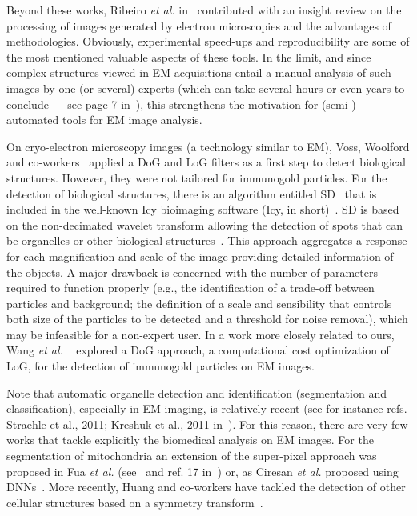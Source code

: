 \documentclass[a4paper,11pt]{article}
\newcommand{\1}{\mathbbm{1}}
\newcommand{\etal}{\emph{et al.} }
\theoremstyle{plain}
\begin{document}
Beyond these works, Ribeiro \etal in~\cite{ribeiro2006computer} contributed with an insight review on the processing of images generated by electron microscopies and the advantages of methodologies. Obviously, experimental speed-ups and reproducibility are some of the most mentioned valuable aspects of these tools. In the limit, and since complex structures viewed in \ac{EM} acquisitions entail a manual analysis of such images by one (or several) experts (which  can take several hours or even years to conclude --- see page 7 in~\cite{knott2013}), this strengthens the motivation for (semi-) automated tools for \ac{EM} image analysis.


On cryo-electron microscopy images (a technology similar to \ac{EM}), Voss, Woolford and co-workers~\cite{voss2009dog,woolford2007laplacian} applied a \ac{DoG} and \ac{LoG} filters as a first step to detect biological structures. However, they were not tailored for immunogold particles. For the detection of biological structures, there is an algorithm entitled \ac{SD}~\cite{olivo2002extraction} that is included in the well-known Icy bioimaging software (Icy, in short)~\cite{de2012icy}. \ac{SD} is based on the non-decimated wavelet transform allowing the detection of spots that can be organelles or other biological structures~\cite{olivo2002extraction}. This approach aggregates a response for each magnification and scale of the image providing detailed information of the objects. A major drawback is concerned with the number of parameters required to function properly (e.g., the identification of a trade-off between particles and background; the definition of a scale and sensibility that controls both size of the particles to be detected and a threshold for noise removal), which may be infeasible for a non-expert user.
In a work more closely related to ours, Wang \etal~\cite{Wang2011} explored a \ac{DoG} approach, a computational cost optimization of \ac{LoG}, for the detection of immunogold particles on \ac{EM} images.

Note that automatic organelle detection and identification (segmentation and classification), especially in \ac{EM} imaging, is relatively recent (see for instance refs. Straehle et al., 2011; Kreshuk et al., 2011 in~\cite{knott2013}). For this reason, there are very few works that tackle explicitly the biomedical analysis on \ac{EM} images. For the segmentation of mitochondria an extension of the super-pixel approach was proposed in Fua \etal (see~\cite{fua2012} and ref. 17 in~\cite{fua2014}) or, as Ciresan \etal proposed using \acp{DNN}~\cite{ciresan2012neural,ciresan2012deep}. More recently, Huang and co-workers have tackled the detection of other cellular structures based on a symmetry transform~\cite{HuangMIUA2014}.
\end{document}
